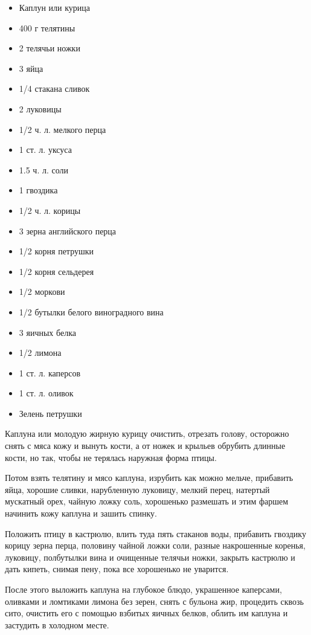 \begin{itemize}
	\item Каплун или курица 
    \item 400 г телятины
    \item 2 телячьи ножки
    \item 3 яйца
    \item 1/4 стакана сливок
    \item 2 луковицы 
    \item 1/2 ч. л. мелкого перца 
    \item 1 ст. л. уксуса 
    \item 1.5 ч. л. соли 
    \item 1 гвоздика
    \item 1/2 ч. л. корицы
    \item 3 зерна английского перца
    \item 1/2 корня петрушки
    \item 1/2 корня сельдерея
    \item 1/2 моркови 
    \item 1/2 бутылки белого виноградного вина 
    \item 3 яичных белка 
    \item 1/2 лимона
    \item 1 ст. л. каперсов 
    \item 1 ст. л. оливок
    \item Зелень петрушки
\end{itemize}

Каплуна или молодую жирную курицу очистить, отрезать голову, осторожно снять с мяса кожу и вынуть кости, а от ножек и крыльев обрубить длинные кости, но так, чтобы не терялась наружная форма птицы.

Потом взять телятину и мясо каплуна, изрубить как можно мельче, прибавить яйца, хорошие сливки, нарубленную луковицу, мелкий перец, натертый мускатный орех, чайную ложку соль, хорошенько размешать и этим фаршем начинить кожу каплуна и зашить спинку.

Положить птицу в кастрюлю, влить туда пять стаканов воды, прибавить гвоздику корицу зерна перца, половину чайной ложки соли, разные накрошенные коренья, луковицу, полбутылки вина и очищенные телячьи ножки, закрыть кастрюлю и дать кипеть, снимая пену, пока все хорошенько не уварится.

После этого выложить каплуна на глубокое блюдо, украшенное каперсами, оливками и ломтиками лимона без зерен, снять с бульона жир, процедить сквозь сито, очистить его с помощью взбитых яичных белков, облить им каплуна и застудить в холодном месте.

